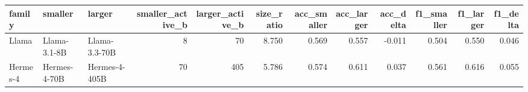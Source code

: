 \begin{tabular}{lllrrrrrrrrr}
\toprule
family & smaller & larger & smaller\_active\_b & larger\_active\_b & size\_ratio & acc\_smaller & acc\_larger & acc\_delta & f1\_smaller & f1\_larger & f1\_delta \\
\midrule
Llama & Llama-3.1-8B & Llama-3.3-70B & 8 & 70 & 8.750 & 0.569 & 0.557 & -0.011 & 0.504 & 0.550 & 0.046 \\
Hermes-4 & Hermes-4-70B & Hermes-4-405B & 70 & 405 & 5.786 & 0.574 & 0.611 & 0.037 & 0.561 & 0.616 & 0.055 \\
\bottomrule
\end{tabular}
